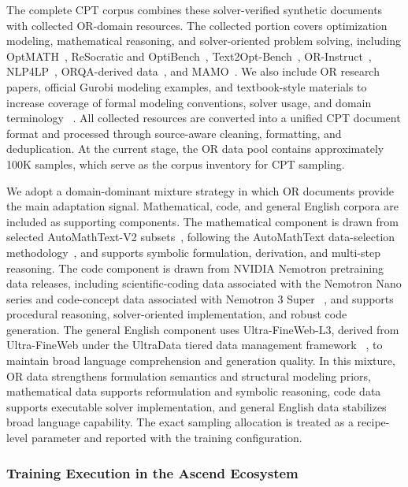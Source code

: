 The complete CPT corpus combines these solver-verified synthetic documents
with collected OR-domain resources. The collected portion covers optimization
modeling, mathematical reasoning, and solver-oriented problem solving,
including OptMATH~\citep{optmath2025}, ReSocratic and
OptiBench~\citep{yang2025optibench}, Text2Opt-Bench~\citep{gao2026text2opt},
OR-Instruct~\citep{orlm}, NLP4LP~\citep{optimus2024}, ORQA-derived
data~\citep{orqa,synthetic_orqa_2025}, and MAMO~\citep{huang2024mamo}. We
also include OR research papers, official Gurobi modeling examples, and
textbook-style materials to increase coverage of formal modeling conventions,
solver usage, and domain terminology
~\citep{frontieror2026,gurobi_modeling_examples,lownes2024or}. All collected
resources are converted into a unified CPT document format and processed
through source-aware cleaning, formatting, and deduplication. At the current
stage, the OR data pool contains approximately 100K samples, which serve as
the corpus inventory for CPT sampling.

We adopt a domain-dominant mixture strategy in which OR documents provide the
main adaptation signal. Mathematical, code, and general English corpora are
included as supporting components. The mathematical component is drawn from
selected AutoMathText-V2 subsets~\citep{automathtext_v2}, following the
AutoMathText data-selection methodology~\citep{automathtext}, and supports
symbolic formulation, derivation, and multi-step reasoning. The code component
is drawn from NVIDIA Nemotron pretraining data releases, including
scientific-coding data associated with the Nemotron Nano series and
code-concept data associated with Nemotron 3 Super
~\citep{nvidia2025nvidianemotronnano2,nvidia2026nemotron3superopen}, and
supports procedural reasoning, solver-oriented implementation, and robust code
generation. The general English component uses Ultra-FineWeb-L3, derived from
Ultra-FineWeb under the UltraData tiered data management framework
~\citep{ultra_fineweb,ultra_data_tiered}, to maintain broad language
comprehension and generation quality. In this mixture, OR data strengthens
formulation semantics and structural modeling priors, mathematical data
supports reformulation and symbolic reasoning, code data supports executable
solver implementation, and general English data stabilizes broad language
capability. The exact sampling allocation is treated as a recipe-level
parameter and reported with the training configuration.

\subsubsection{Training Execution in the Ascend Ecosystem}
\label{subsubsec:cpt_training_execution}

